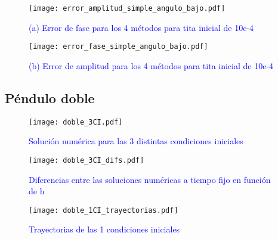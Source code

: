 \documentclass[aps,prb,twocolumn,superscriptaddress,floatfix,longbibliography]{revtex4-2}
\newcounter{para}
\begin{document}
\begin{figure}[h]
  \texttt{[image: error\_amplitud\_simple\_angulo\_bajo.pdf]}
  \caption{\textcolor{blue}{(a) Error de fase para los 4 métodos para tita inicial de 10e-4}}
   \label{fig:error_amplitud_simple_angulo_bajo}
\end{figure}



\begin{figure}[h]
  \texttt{[image: error\_fase\_simple\_angulo\_bajo.pdf]}
  \caption{\textcolor{blue}{(b) Error de amplitud para los 4 métodos para tita inicial de 10e-4}}
   \label{fig:error_fase_simple_angulo_bajo}
\end{figure}


\subsection{Péndulo doble}

\begin{figure}[h]
  \texttt{[image: doble\_3CI.pdf]}
  \caption{\textcolor{blue}{Solución numérica para las 3 distintas condiciones iniciales}}
   \label{fig:doble_3CI}
\end{figure}

\begin{figure}[h]
  \texttt{[image: doble\_3CI\_difs.pdf]}
  \caption{\textcolor{blue}{Diferencias entre las soluciones numéricas a tiempo fijo en función de h}}
   \label{fig:doble_3CI_difs}
\end{figure}

\begin{figure}[h]
  \texttt{[image: doble\_1CI\_trayectorias.pdf]}
  \caption{\textcolor{blue}{Trayectorias de las 1 condiciones iniciales}}
   \label{fig:doble_1CI_trayectorias}
\end{figure}
\end{document}
